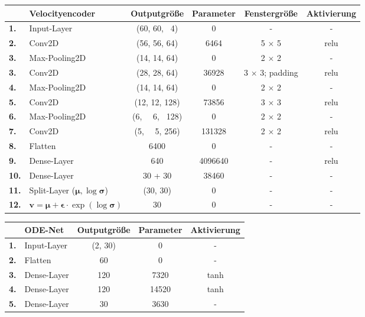 \documentclass[12pt]{article}
\begin{document}
	\begin{table}[htb]
		\begin{center}
			\begin{tabular}{llcccc}\toprule
				\textbf{\ }	&\textbf{Velocityencoder}	&\textbf{Outputgröße} &\textbf{Parameter} &\textbf{Fenstergröße} &\textbf{Aktivierung}\\
				\midrule
				\textbf{1.}	&Input-Layer	& (60, 60, \ 4)		& 0		& - 			&- \\
				\textbf{2.}	&Conv2D 		& (56, 56, 64)		& 6464	& 5 $\times$ 5	&relu \\
				\textbf{3.}	&Max-Pooling2D	& (14, 14, 64)		& 0		& 2 $\times$ 2	&- \\
				\textbf{3.}	&Conv2D 		& (28, 28, 64)		& 36928	& 3 $\times$ 3; padding	&relu \\
				\textbf{4.}	&Max-Pooling2D	& (14, 14, 64)		& 0		& 2 $\times$ 2	&- \\
				\textbf{5.}	&Conv2D			& (12, 12, 128)		& 73856 & 3 $\times$ 3	&relu \\
				\textbf{6.}	&Max-Pooling2D	& (6, \ \ 6, \ 128)	& 0		& 2 $\times$ 2 	&- \\
				\textbf{7.}	&Conv2D		& (5, \ \ 5,  256)		& 131328& 2 $\times$ 2 	&relu \\
				\textbf{8.}	&Flatten		& 6400				& 0		& - 			&- \\
				\textbf{9.}	&Dense-Layer			& 640				& 4096640	& - 			&relu \\
				\textbf{10.}	&Dense-Layer 			& 30 + 30				& 38460	& - 			&- \\
				\textbf{11.}	&Split-Layer	($\boldsymbol{\mu}, \log\boldsymbol{\sigma}$)	& (30, 30)				& 0	& - 			&- \\
				\textbf{12.}&$\mathbf{v}=\boldsymbol{\mu}+\boldsymbol{\epsilon}\cdot\exp(\log\boldsymbol{\sigma})$		& 30				& 0	& - 			&-\\
				\bottomrule
			\end{tabular}
		\end{center}
	\end{table}

	\begin{table}[htb]
		\begin{center}
			\begin{tabular}{llccc}\toprule
				\textbf{\ }	&\textbf{ODE-Net}	&\textbf{Outputgröße} &\textbf{Parameter}  &\textbf{Aktivierung}\\
				\midrule
				\textbf{1.}	&Input-Layer	& (2, 30)		& 0			&- \\
				\textbf{2.}	&Flatten	 	& 60			& 0			&- \\
				\textbf{3.}	&Dense-Layer			& 120			& 7320		&tanh \\
				\textbf{4.}	&Dense-Layer			& 120			& 14520		&tanh \\
				\textbf{5.}	&Dense-Layer			& 30			& 3630		&- \\
				\bottomrule
			\end{tabular}
		\end{center}
	\end{table}
\end{document}
